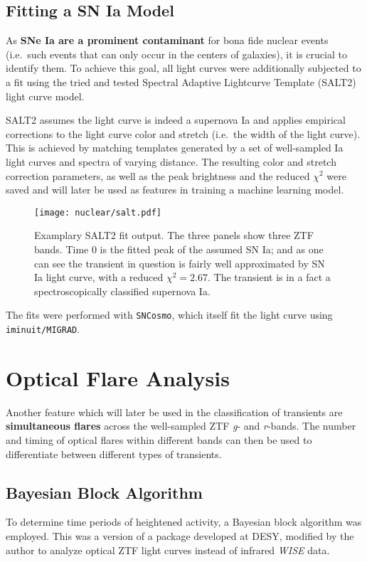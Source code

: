 \subsection{Fitting a SN Ia Model}\label{salt}
As \textbf{SNe Ia are a prominent contaminant} for bona fide nuclear events (i.e.~such events that can only occur in the centers of galaxies), it is crucial to identify them. To achieve this goal, all light curves were additionally subjected to a fit using the tried and tested Spectral Adaptive Lightcurve Template (SALT2)~ light curve model.

SALT2 assumes the light curve is indeed a supernova Ia and applies empirical corrections to the light curve color and stretch (i.e.~the width of the light curve). This is achieved by matching templates generated by a set of well-sampled Ia light curves and spectra of varying distance. The resulting color and stretch correction parameters, as well as the peak brightness and the reduced $\chi^2$ were saved and will later be used as features in training a machine learning model.

\begin{figure}[H]
    \texttt{[image: nuclear/salt.pdf]}
    \caption[SALT2 Fit]{Examplary SALT2 fit output. The three panels show three ZTF bands. Time 0 is the fitted peak of the assumed SN Ia; and as one can see the transient in question is fairly well approximated by SN Ia light curve, with a reduced  $\chi^2=2.67$. The transient is in a fact a spectroscopically classified supernova Ia.}
\end{figure}

The fits were performed with \texttt{SNCosmo}, which itself fit the light curve using \texttt{iminuit/MIGRAD}.

\section{Optical Flare Analysis}\label{bayesian_blocks}
Another feature which will later be used in the classification of transients are \textbf{simultaneous flares} across the well-sampled ZTF \textit{g}- and \textit{r}-bands. The number and timing of optical flares within different bands can then be used to differentiate between different types of transients.

\subsection{Bayesian Block Algorithm}
To determine time periods of heightened activity, a Bayesian block algorithm was employed. This was a version of a package developed at DESY, modified by the author to analyze optical ZTF light curves instead of infrared \textit{WISE} data.

